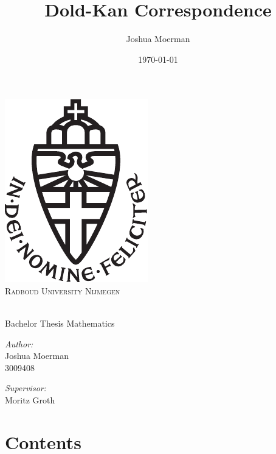 \documentclass[titlepage, 11pt]{amsproc}
\title{Dold-Kan Correspondence}
\author{Joshua Moerman}
\date{\today}
\theoremstyle{plain}
\theoremstyle{definition}
\begin{document}
\begin{titlepage}
\centering
\vspace{10cm}

\includegraphics[scale=0.2]{ru}\\
\textsc{Radboud University Nijmegen}
\vspace{3cm}

{\huge \bfseries \makeatletter\@title\makeatother}\\
Bachelor Thesis Mathematics
\vspace{3cm}

\begin{minipage}{0.4\textwidth}
\begin{flushleft} \large
\emph{Author:}\\
Joshua Moerman\\
3009408
\end{flushleft}
\end{minipage}
\begin{minipage}{0.4\textwidth}
\begin{flushright} \large
\emph{Supervisor:} \\
Moritz Groth
\end{flushright}
\end{minipage}

\vfill
\makeatletter\@date\makeatother

\end{titlepage}

\section*{Contents}
\renewcommand\contentsname{}
\tableofcontents
\end{document}
